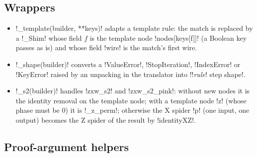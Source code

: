 {\subsection{Wrappers}\label{sec:lean-export-net-wrappers}

\begin{itemize}
\item \py!_template(builder, **keys)! adapts a template rule: the match is replaced by a
  \py!_Shim! whose field $f$ is the template node \py!nodes[keys[f]]! (a Boolean key passes as
  is) and whose field \code!wire! is the match's first wire.
\item \py!_shape(builder)! converts a \py!ValueError!, \py!StopIteration!, \py!IndexError! or
  \py!KeyError! raised by an unpacking in the translator into
  \code!!\textit{rule}\code! step shape!.
\item \py!_s2(builder)! handles \code!zxw_s2! and \code!zxw_s2_pink!: without new nodes it is the
  identity removal on the template node; with a template node \code!z! (whose phase must be 0) it
  is \py!_z_perm!; otherwise the X spider \code!p! (one input, one output) becomes the Z spider of
  the result by \lean!identityXZ!.
\end{itemize}

\subsection{Proof-argument helpers}\label{sec:lean-export-net-helpers}

}

